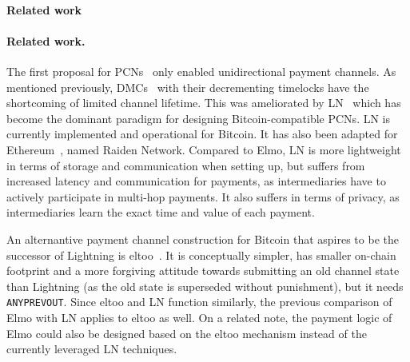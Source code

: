 \makeatletter%
%
  {\paragraph{Related work}}%
  {\paragraph{Related work.}}%
\makeatother%
 The first proposal for PCNs~\cite{spilman} only enabled
 unidirectional payment channels. As mentioned previously, DMCs~\cite{decker}
 with their decrementing timelocks have the shortcoming of limited channel
 lifetime. This was ameliorated by LN~\cite{lightning} which has become the dominant paradigm for designing Bitcoin-compatible PCNs.
 LN is currently implemented and operational for
  Bitcoin. It has also been adapted for Ethereum~\cite{wood2014ethereum}, named
  Raiden Network. Compared to Elmo, LN is more lightweight in terms of
  storage and communication when setting up, but suffers from increased latency
  and communication for payments, as intermediaries have to actively participate
  in multi-hop payments. It also suffers in terms of privacy, as intermediaries
  learn the exact time and value of each payment.

%
%

  An alternantive payment channel construction for Bitcoin that aspires to be
  the successor of Lightning is eltoo~\cite{eltoo}. It is conceptually simpler,
  has smaller on-chain footprint and a more forgiving attitude towards
  submitting an old channel state than Lightning (as the old state is superseded without punishment), but it needs
  \texttt{ANYPREVOUT}. Since eltoo and LN function similarly, the previous comparison of
  Elmo with LN applies to eltoo as well. On a related note, the payment
  logic of Elmo could also be designed based on the eltoo mechanism instead of
  the currently leveraged LN techniques.


